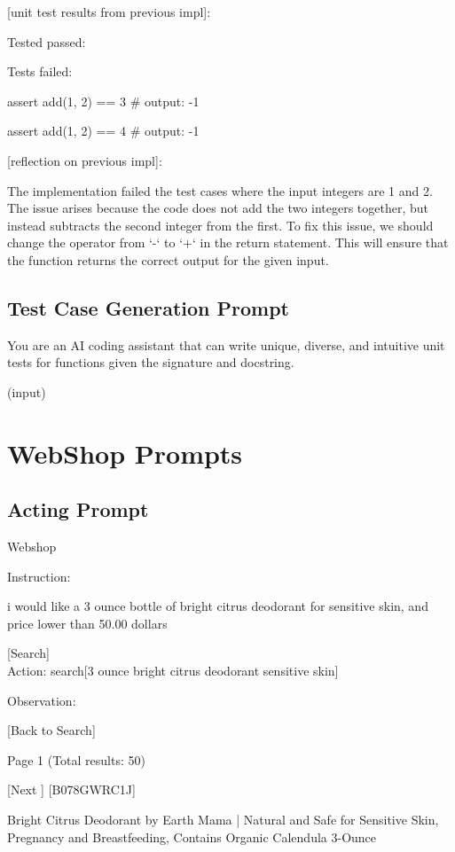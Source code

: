 \documentclass{article} \usepackage{iclr2024_conference,times}
\begin{document}
[unit test results from previous impl]:

Tested passed:

Tests failed:

assert add(1, 2) == 3 \# output: -1

assert add(1, 2) == 4 \# output: -1

[reflection on previous impl]:

The implementation failed the test cases where the input integers are 1 and 2. The issue arises because the code does not add the two integers together, but instead subtracts the second integer from the first. To fix this issue, we should change the operator from `-` to `+` in the return statement. This will ensure that the function returns the correct output for the given input.

\subsection{Test Case Generation Prompt}

You are an AI coding assistant that can write unique, diverse, and intuitive unit tests for functions given the signature and docstring.

(input)

\section{WebShop Prompts}
\label{sec:webshop_prompt}
\subsection{Acting Prompt}

Webshop 

Instruction:  

i would like a 3 ounce bottle of bright citrus deodorant for sensitive skin, and price lower than 50.00 dollars 

[Search]  
\\

Action: search[3 ounce bright citrus deodorant sensitive skin]

Observation: 

[Back to Search] 

Page 1 (Total results: 50) 

[Next
] 
[B078GWRC1J] 

Bright Citrus Deodorant by Earth Mama | Natural and Safe for Sensitive Skin, Pregnancy and Breastfeeding, Contains Organic Calendula 3-Ounce 
\end{document}

